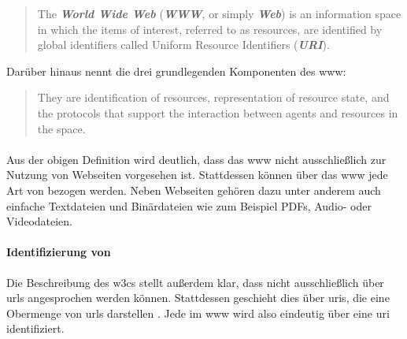         \begin{quote}
            The \textit{\textbf{World Wide Web}} (\textit{\textbf{WWW}}, or simply \textit{\textbf{Web}})
            is an information space in which the items of interest, referred to as resources,
            are identified by global identifiers called Uniform Resource Identifiers (\textit{\textbf{URI}}).
        \end{quote}

        Darüber hinaus nennt \cite{w3c:wwwArch} die drei grundlegenden Komponenten des \gls{www}:

        \begin{quote}
            They are identification of resources,
            representation of resource state, and the protocols
            that support the interaction between agents and resources in the space.
        \end{quote}

        \paragraph*{\resources}
        Aus der obigen Definition wird deutlich,
        dass das \gls{www} nicht ausschließlich zur Nutzung von Webseiten
        vorgesehen ist.
        Stattdessen können über das \gls{www} jede Art von {\resources} bezogen werden.
        Neben Webseiten gehören dazu unter anderem auch einfache Textdateien
        und Binärdateien wie zum Beispiel PDFs, Audio- oder Videodateien.

        \paragraph*{Identifizierung von \resources}
        Die Beschreibung des \glspl{w3c} stellt außerdem klar,
        dass {\resources} nicht ausschließlich über \glspl{url} angesprochen werden können.
        Stattdessen geschieht dies über \glspl{uri}, die eine Obermenge von \glspl{url} darstellen
        \cite[Kapitel 1.1.3, Seite 7]{rfc:3986}.
        Jede {\resource} im \gls{www} wird also eindeutig über eine \gls{uri} identifiziert.

